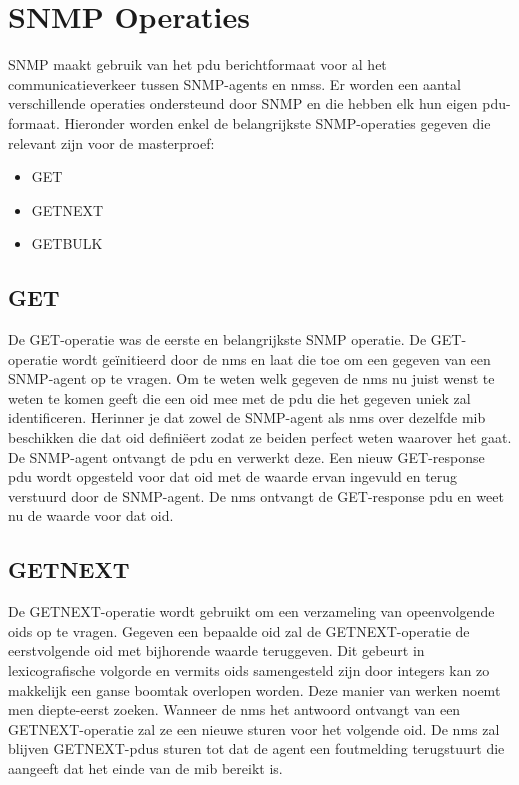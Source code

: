 \section{SNMP Operaties}
\label{snmp-operaties}
SNMP maakt gebruik van het \gls{pdu} berichtformaat voor al het communicatieverkeer tussen SNMP-agents en \glspl{nms}.
Er worden een aantal verschillende operaties ondersteund door SNMP en die hebben elk hun eigen \gls{pdu}-formaat\cite{essentialsnmp}.
Hieronder worden enkel de belangrijkste SNMP-operaties gegeven die relevant zijn voor de masterproef:

\begin{itemize}
	\item GET
	\item GETNEXT
	\item GETBULK
\end{itemize}


\subsection{GET}
De GET-operatie was de eerste en belangrijkste SNMP operatie.
De GET-operatie wordt geïnitieerd door de \gls{nms} en laat die toe om een gegeven van een SNMP-agent op te vragen.
Om te weten welk gegeven de \gls{nms} nu juist wenst te weten te komen geeft die een \gls{oid} mee met de \gls{pdu} die het gegeven uniek zal identificeren.
Herinner je dat zowel de SNMP-agent als \gls{nms} over dezelfde \gls{mib} beschikken die dat \gls{oid} definiëert zodat ze beiden perfect weten waarover het gaat.
De SNMP-agent ontvangt de \gls{pdu} en verwerkt deze. Een nieuw GET-response \gls{pdu} wordt opgesteld voor dat \gls{oid} met de waarde ervan ingevuld en
terug verstuurd door de SNMP-agent. De \gls{nms} ontvangt de GET-response \gls{pdu} en weet nu de waarde voor dat \gls{oid}.



\subsection{GETNEXT}
\label{snmp-getnext}
De GETNEXT-operatie wordt gebruikt om een verzameling van opeenvolgende \glspl{oid} op te vragen.
Gegeven een bepaalde \gls{oid} zal de GETNEXT-operatie de eerstvolgende \gls{oid} met bijhorende waarde teruggeven.
Dit gebeurt in lexicografische volgorde en vermits \glspl{oid} samengesteld zijn door integers kan zo makkelijk een ganse boomtak overlopen worden.
Deze manier van werken noemt men diepte-eerst zoeken.\cite{essentialsnmp}
Wanneer de \gls{nms} het antwoord ontvangt van een GETNEXT-operatie zal ze een nieuwe sturen voor het volgende \gls{oid}.
De \gls{nms} zal blijven GETNEXT-\glspl{pdu} sturen tot dat de agent een foutmelding terugstuurt die aangeeft dat het einde van de \gls{mib} bereikt is.

